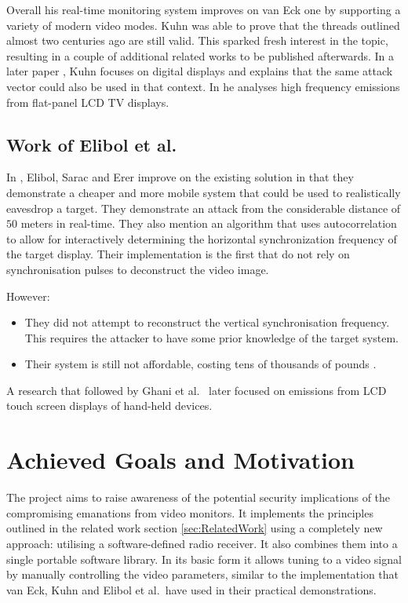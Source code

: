 \documentclass[a4paper,12pt,twoside,openright]{report}
\begin{document}
Overall his real-time monitoring system improves on van Eck one by supporting a variety of modern video modes. Kuhn was able to prove that the threads outlined almost two centuries ago are still valid. This sparked fresh interest in the topic, resulting in a couple of additional related works to be published afterwards. In a later paper \cite{kuhn2005electromagnetic}, Kuhn focuses on digital displays and explains that the same attack vector could also be used in that context. In \cite{kuhn2011compromising} he analyses high frequency emissions from flat-panel LCD TV displays.

\subsection{Work of Elibol et al.}

In \cite{elibol2012realistic}, Elibol, Sarac and Erer improve on the existing solution in that they demonstrate a cheaper and more mobile system that could be used to realistically eavesdrop a target. They demonstrate an attack from the considerable distance of $50$ meters in real-time. They also mention an algorithm that uses autocorrelation to allow for interactively determining the horizontal synchronization frequency of the target display. Their implementation is the first that do not rely on synchronisation pulses to deconstruct the video image.

However:

\begin{itemize}

  \item They did not attempt to reconstruct the vertical synchronisation frequency. This requires the attacker to have some prior knowledge of the target system.
  \item Their system is still not affordable, costing tens of thousands of pounds \cite{nipxi5665}.

\end{itemize}

A research that followed by Ghani et al.\ \cite{ghani2013radiated} later focused on emissions from LCD touch screen displays of hand-held devices.

\section{Achieved Goals and Motivation}

The project aims to raise awareness of the potential security implications of the compromising emanations from video monitors. It implements the principles outlined in the related work section \ref{sec:RelatedWork} using a completely new approach: utilising a software-defined radio receiver. It also combines them into a single portable software library. In its basic form it allows tuning to a video signal by manually controlling the video parameters, similar to the implementation that van Eck, Kuhn and Elibol et al.\ have used in their practical demonstrations.
\end{document}
